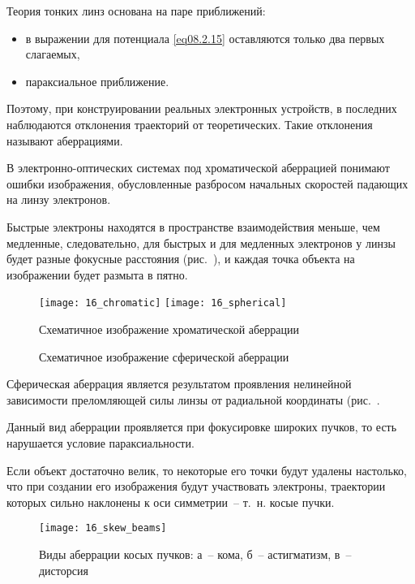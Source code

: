 
Теория тонких линз основана на паре приближений:
\begin{itemize}
  \item в выражении для потенциала \eqref{eq08.2.15} оставляются только два
    первых слагаемых,
  \item параксиальное приближение.
\end{itemize}

Поэтому, при конструировании реальных электронных устройств, в последних
наблюдаются отклонения траекторий от теоретических. Такие отклонения называют
аберрациями.


В электронно-оптических системах под хроматической аберрацией понимают ошибки
изображения, обусловленные разбросом начальных скоростей падающих на линзу
электронов.

Быстрые электроны находятся в пространстве взаимодействия меньше, чем медленные,
следовательно, для быстрых и для медленных электронов у линзы будет разные
фокусные расстояния (рис.~), и каждая точка объекта на изображении
будет размыта в пятно.

\begin{figure}[h!]
  \center
  \vspace{-2em}
  \texttt{[image: 16\_chromatic]} \hspace{1em}
  \texttt{[image: 16\_spherical]} \\
  \parbox{.3\textwidth}{\caption{Схематичное изображение хроматической
    аберрации} \label{pic16chrome}} \hspace{1em}
  \parbox{.3\textwidth}{\caption{Схематичное изображение сферической
    аберрации} \label{pic16sphere}}
  \vspace{-2em}
\end{figure}


Сферическая аберрация является результатом проявления нелинейной зависимости
преломляющей силы линзы от радиальной координаты (рис.~.

Данный вид аберрации проявляется при фокусировке широких пучков, то есть
нарушается условие параксиальности.


Если объект достаточно велик, то некоторые его точки будут удалены настолько,
что при создании его изображения будут участвовать электроны, траектории которых
сильно наклонены к оси симметрии~-- т.~н. косые пучки.
\begin{figure}[h!]
  \center
  \texttt{[image: 16\_skew\_beams]} \\
  \caption{Виды аберрации косых пучков: а~-- кома, б~-- астигматизм, в~--
    дисторсия}
  \label{pic16skew}
\end{figure}

